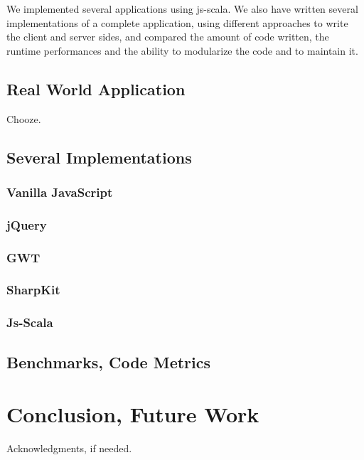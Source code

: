 \documentclass[preprint]{sigplanconf}
\begin{document}
We implemented several applications using js-scala. We also have written several implementations of a complete
application, using different approaches to write the client and server sides, and compared the amount of code
written, the runtime performances and the ability to modularize the code and to maintain it.

\subsection{Real World Application}

Chooze.

\subsection{Several Implementations}

\subsubsection{Vanilla JavaScript}

\subsubsection{jQuery}

\subsubsection{GWT}

\subsubsection{SharpKit}

\subsubsection{Js-Scala}

\subsection{Benchmarks, Code Metrics}

\section{Conclusion, Future Work}
\label{discussion}

%
%
\acks

Acknowledgments, if needed.



%
%
%
\end{document}
